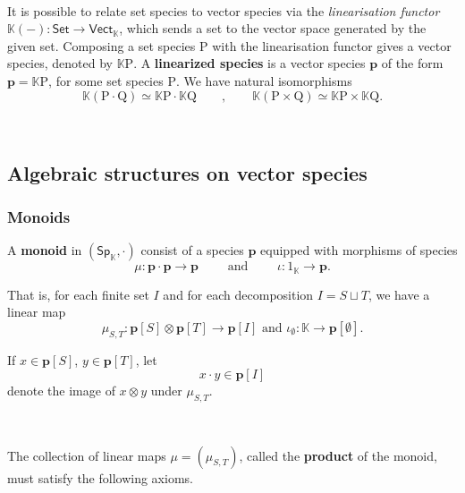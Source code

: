 \documentclass[12pt, reqno]{amsart}
\theoremstyle{definition}
\newcommand{\Vect}{\mathsf{Vect}}
\newcommand{\Set}{\mathsf{Set}}
\newcommand{\Ssk}{\mathsf{Sp}_\Kb} %
\newcommand{\Kb}{\mathbb{K}}
\newcommand{\rP}{\mathrm{P}}
\newcommand{\rQ}{\mathrm{Q}}
\newcommand{\tp}{\mathbf{p}}
\begin{document}
\

It is possible to relate set species to vector species via the \emph{linearisation functor} $\mathbb{K}(-): \Set \to \Vect_{\mathbb{K}}$, which sends a set to the vector space generated by the given set. Composing a set species $\rP$ with the linearisation functor gives a vector species, denoted by $\mathbb{K}\rP$. A {\bf linearized species} is a vector species $\tp$ of the form $\tp=\mathbb{K}\rP$, for some set species $\rP$. We have natural isomorphisms
 \[\mathbb{K}(\rP \cdot \rQ)\simeq \mathbb{K}\rP \cdot \mathbb{K}\rQ \qquad , \qquad \mathbb{K}(\rP \times \rQ)\simeq \mathbb{K}\rP \times \mathbb{K}\rQ.\]

\

\subsection{Algebraic structures on vector species}


\subsubsection{Monoids}
A {\bf monoid} in $(\Ssk, \cdot)$  consist of a species $\tp$ equipped with morphisms of species
\begin{equation*}
    \mu: \tp \cdot \tp \to \tp \qquad \text{ and } \qquad \iota: \mathrm{1}_{\mathbb{K}} \to \tp.
\end{equation*}

That is, for each finite set $I$ and for each decomposition $I=S \sqcup T$, we have a linear map 
\begin{equation*}
    \mu_{S,T}: \tp[S] \otimes \tp[T]\to \tp[I] \text{ and } \iota_\emptyset: \mathbb{K} \to \tp[\emptyset].
\end{equation*}

If $x \in \tp[S]$, $y \in \tp[T]$,  let 
\[x \cdot y \in \tp[I]\]
denote the image of $x\otimes y$ under $\mu_{S,T}$. 

\

The collection of linear maps $\mu=(\mu_{S,T})$, called the {\bf product} of the monoid, must satisfy the following axioms.

\
\end{document}
